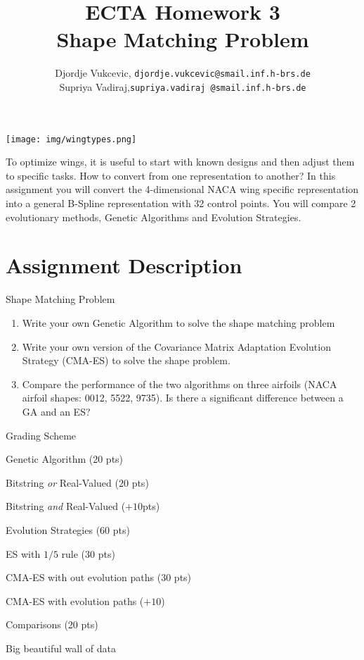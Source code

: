 \documentclass{article}
\title{ECTA Homework 3\\Shape Matching Problem}
\author{\color{red} Djordje Vukcevic, \texttt{djordje.vukcevic@smail.inf.h-brs.de}\\
	\color{red}	Supriya Vadiraj,\texttt{supriya.vadiraj @smail.inf.h-brs.de}}
\begin{document}
\maketitle
\begin{center}
	\begin{minipage}{1\linewidth}
		\centering
			\texttt{[image: img/wingtypes.png]}
	\end{minipage}
\end{center}

To optimize wings, it is useful to start with known designs and then adjust them to specific tasks. How to convert from one representation to another? In this assignment you will convert the 4-dimensional NACA wing specific representation into a general B-Spline representation with 32 control points. You will compare 2 evolutionary methods, Genetic Algorithms and Evolution Strategies.

\newpage

\section{Assignment Description}
	Shape Matching Problem
	\begin{enumerate}
		\item Write your own Genetic Algorithm to solve the shape matching problem
		\item Write your own version of the Covariance Matrix Adaptation Evolution Strategy (CMA-ES) to solve the shape problem.
		\item Compare the performance of the two algorithms on three airfoils (NACA airfoil shapes: 0012, 5522, 9735). Is there a significant difference between a GA and an ES? 
	\end{enumerate}

	\begin{itemize}
 	\item Grading Scheme
 		\item Evolution Strategies (60 pts)
 		\item Comparisons (20 pts)
 		\end{todolist}
	\end{itemize}
\newpage
\end{document}
